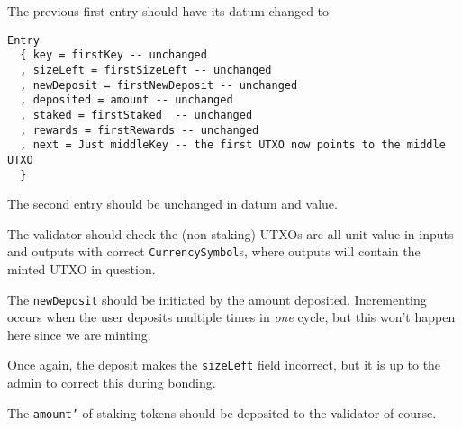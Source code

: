 \documentclass[10pt, a4paper]{article}
\theoremstyle{definition}
\begin{document}
\begin{enumerate}
{The previous first entry should have its datum changed to \begin{verbatim}
Entry
  { key = firstKey -- unchanged
  , sizeLeft = firstSizeLeft -- unchanged
  , newDeposit = firstNewDeposit -- unchanged
  , deposited = amount -- unchanged
  , staked = firstStaked  -- unchanged
  , rewards = firstRewards -- unchanged
  , next = Just middleKey -- the first UTXO now points to the middle UTXO
  }
\end{verbatim}

The second entry should be unchanged in datum and value.

The validator should check the (non staking) UTXOs are all unit value in inputs and outputs with correct \texttt{CurrencySymbol}s, where outputs will contain the minted UTXO in question.

The \texttt{newDeposit} should be initiated by the amount deposited. Incrementing occurs when the user deposits multiple times in \textit{one} cycle, but this won't happen here since we are minting.

Once again, the deposit makes the \texttt{sizeLeft} field incorrect, but it is up to the admin to correct this during bonding.

The \texttt{amount'} of staking tokens should be deposited to the validator of course.
}
\end{enumerate}
\end{document}
